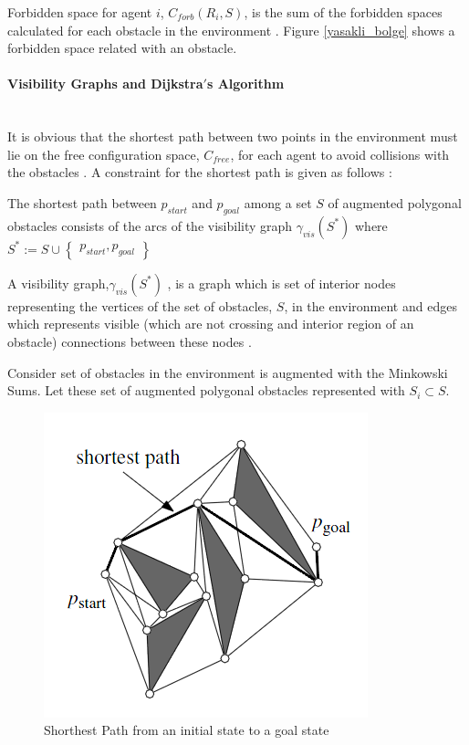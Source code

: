 Forbidden space for agent $i$, $C_{forb}(R_i, S)$, is the sum of the forbidden spaces calculated for each obstacle in the environment \cite{92}. Figure \ref{yasakli_bolge} shows a forbidden space related with an obstacle.
	
\paragraph{Visibility Graphs and Dijkstra$'$s Algorithm}\hspace{0pt} \\
It is obvious that the shortest path between two points in the environment must lie on the free configuration space, $C_{free}$, for each agent to avoid collisions with the obstacles . A constraint for the shortest path is given as follows \cite{92}: 

\begin{displayquote}
The shortest path between $p_{start}$ and $p_{goal}$ among a set $S$ of augmented polygonal obstacles consists of the arcs of the visibility graph $\gamma_{vis}(S^*)$ where $S^* := S \cup \begin{Bmatrix}
p_{start}, p_{goal}
\end{Bmatrix}$
\end{displayquote}

A visibility graph,$\gamma_{vis}(S^*)$ , is a graph which is set of interior nodes representing the vertices of the set of obstacles, $S$, in the environment and edges which represents visible (which are not crossing and interior region of an obstacle) connections between these nodes \cite{92}. 

Consider set of obstacles in the environment is augmented with the Minkowski Sums. Let these set of augmented polygonal obstacles represented with $S_i \subset S$. 

\begin{figure}[H]
\caption{Shorthest Path from an initial state to a goal state \cite{92}} \label{dijksttae_visibility}
\centering
\includegraphics[scale = 0.6]{shortest}
\end{figure} 

